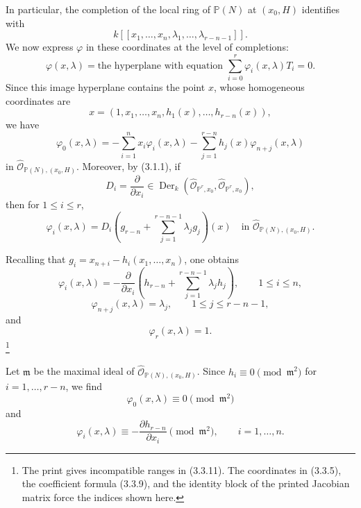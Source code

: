 In particular, the completion of the local ring of $\mathbb P(N)$ at
$(x_0,H)$ identifies with
\[
k[[x_1,\ldots,x_n,\lambda_1,\ldots,\lambda_{r-n-1}]].
\]
We now express $\varphi$ in these coordinates at the level of
completions:
\begin{equation}\tag{3.3.6}
\varphi(x,\lambda)
=\text{the hyperplane with equation }
\sum_{i=0}^{r}\varphi_i(x,\lambda)T_i=0.
\end{equation}
Since this image hyperplane contains the point $x$, whose homogeneous
coordinates are
\begin{equation}\tag{3.3.7}
x=(1,x_1,\ldots,x_n,h_1(x),\ldots,h_{r-n}(x)),
\end{equation}
we have
\begin{equation}\tag{3.3.8}
\varphi_0(x,\lambda)
=-\sum_{i=1}^{n}x_i\varphi_i(x,\lambda)
 -\sum_{j=1}^{r-n}h_j(x)\varphi_{n+j}(x,\lambda)
\end{equation}
in $\widehat{\mathcal O}_{\mathbb P(N),(x_0,H)}$.  Moreover, by
(3.1.1), if
\[
D_i=\frac{\partial}{\partial x_i}\in
\operatorname{Der}_k(
\widehat{\mathcal O}_{\mathbb P^r,x_0},
\widehat{\mathcal O}_{\mathbb P^r,x_0}),
\]
then for $1\leq i\leq r$,
\begin{equation}\tag{3.3.9}
\varphi_i(x,\lambda)
=D_i\!\left(g_{r-n}+
\sum_{j=1}^{r-n-1}\lambda_jg_j\right)(x)
\quad\text{in }\widehat{\mathcal O}_{\mathbb P(N),(x_0,H)}.
\end{equation}

Recalling that $g_i=x_{n+i}-h_i(x_1,\ldots,x_n)$, one obtains
\begin{equation}\tag{3.3.10}
\varphi_i(x,\lambda)
=-\frac{\partial}{\partial x_i}
\left(h_{r-n}+\sum_{j=1}^{r-n-1}\lambda_jh_j\right),
\qquad 1\leq i\leq n,
\end{equation}
\begin{equation}\tag{3.3.11}
\varphi_{n+j}(x,\lambda)=\lambda_j,
\qquad 1\leq j\leq r-n-1,
\end{equation}
and
\begin{equation}\tag{3.3.12}
\varphi_r(x,\lambda)=1.
\end{equation}
\footnote{The print gives incompatible ranges in (3.3.11).  The
coordinates in (3.3.5), the coefficient formula (3.3.9), and the
identity block of the printed Jacobian matrix force the indices shown
here.}

Let $\mathfrak m$ be the maximal ideal of
$\widehat{\mathcal O}_{\mathbb P(N),(x_0,H)}$.  Since
$h_i\equiv0\pmod{\mathfrak m^2}$ for $i=1,\ldots,r-n$, we find
\begin{equation}\tag{3.3.13}
\varphi_0(x,\lambda)\equiv0\pmod{\mathfrak m^2}
\end{equation}
and
\begin{equation}\tag{3.3.14}
\varphi_i(x,\lambda)
\equiv-\frac{\partial h_{r-n}}{\partial x_i}
\pmod{\mathfrak m^2},
\qquad i=1,\ldots,n.
\end{equation}
